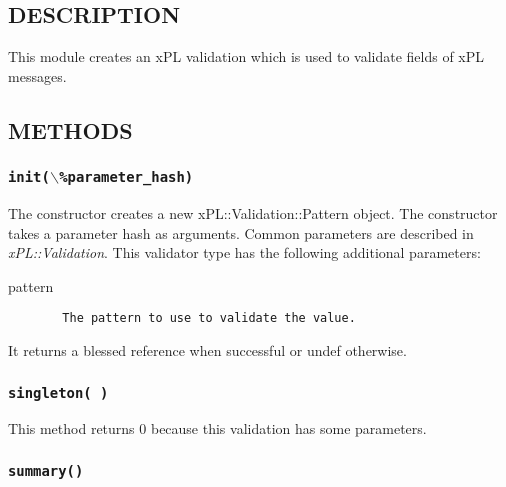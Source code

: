 \subsection*{DESCRIPTION\label{xPL::Validation::Pattern_DESCRIPTION}}


This module creates an xPL validation which is used to validate fields
of xPL messages.

\subsection*{METHODS\label{xPL::Validation::Pattern_METHODS}}
\subsubsection*{\texttt{init($\backslash$\%parameter\_hash)}\label{xPL::Validation::Pattern_init_backslash_parameter_hash_}}


The constructor creates a new xPL::Validation::Pattern object.
The constructor takes a parameter hash as arguments.  Common
parameters are described in \emph{xPL::Validation}.  This validator type
has the following additional parameters:

\begin{description}

\item[{pattern}] \mbox{}\begin{verbatim}
  The pattern to use to validate the value.
\end{verbatim}
\end{description}


It returns a blessed reference when successful or undef otherwise.

\subsubsection*{\texttt{singleton( )}\label{xPL::Validation::Pattern_singleton_}}


This method returns 0 because this validation has some parameters.

\subsubsection*{\texttt{summary()}\label{xPL::Validation::Pattern_summary_}}
